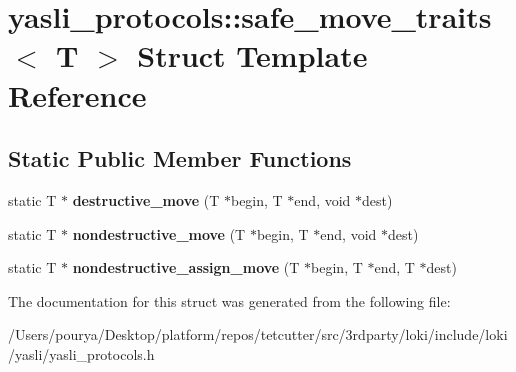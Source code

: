 \hypertarget{structyasli__protocols_1_1safe__move__traits}{}\section{yasli\+\_\+protocols\+:\+:safe\+\_\+move\+\_\+traits$<$ T $>$ Struct Template Reference}
\label{structyasli__protocols_1_1safe__move__traits}
\subsection*{Static Public Member Functions}
\begin{DoxyCompactItemize}
\item 
\hypertarget{structyasli__protocols_1_1safe__move__traits_a38d0431536d13686343eca1e609e9864}{}static T $\ast$ {\bfseries destructive\+\_\+move} (T $\ast$begin, T $\ast$end, void $\ast$dest)\label{structyasli__protocols_1_1safe__move__traits_a38d0431536d13686343eca1e609e9864}

\item 
\hypertarget{structyasli__protocols_1_1safe__move__traits_aae150d5bb1b55422c90db0902359458d}{}static T $\ast$ {\bfseries nondestructive\+\_\+move} (T $\ast$begin, T $\ast$end, void $\ast$dest)\label{structyasli__protocols_1_1safe__move__traits_aae150d5bb1b55422c90db0902359458d}

\item 
\hypertarget{structyasli__protocols_1_1safe__move__traits_a125f1f495e2dd9e4aa5cc2f7fba33ce7}{}static T $\ast$ {\bfseries nondestructive\+\_\+assign\+\_\+move} (T $\ast$begin, T $\ast$end, T $\ast$dest)\label{structyasli__protocols_1_1safe__move__traits_a125f1f495e2dd9e4aa5cc2f7fba33ce7}

\end{DoxyCompactItemize}


The documentation for this struct was generated from the following file\+:\begin{DoxyCompactItemize}
\item 
/\+Users/pourya/\+Desktop/platform/repos/tetcutter/src/3rdparty/loki/include/loki/yasli/yasli\+\_\+protocols.\+h\end{DoxyCompactItemize}
